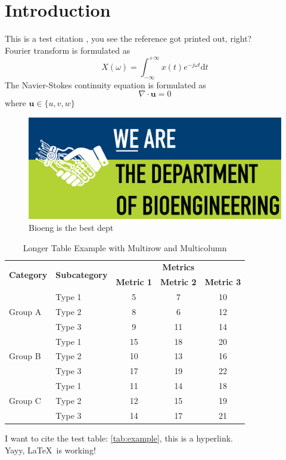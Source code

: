 \newpage

\section{Introduction}

{
This is a test citation \cite{oreo}, you see the reference got printed out, right? \\

Fourier transform is formulated as
\[
    X(\omega) = \int_{-\infty}^{+\infty} x(t)e^{-j\omega t} \mathrm{d}t
\]
The Navier-Stokes continuity equation is formulated as
\[
    \nabla \cdot \mathbf{u} = 0
\]
where $\textbf{u} \in \{u, v, w\}$ \\

\begin{figure}[H]
    \centering
    \includegraphics{figures/Bioeng.png}
    \caption{Bioeng is the best dept}
    \label{fig:my_label}
\end{figure}

\begin{table}[h]
\centering
\begin{tabular}{llccc}
\toprule
\multirow{2}{*}{\textbf{Category}} & \multirow{2}{*}{\textbf{Subcategory}} & \multicolumn{3}{c}{\textbf{Metrics}} \\ \cmidrule(lr){3-5}
&& \textbf{Metric 1} & \textbf{Metric 2} & \textbf{Metric 3} \\ \midrule
    \multirow{3}{*}{Group A}
    & Type 1& 5& 7& 10\\
    & Type 2& 8& 6& 12\\
    & Type 3& 9& 11& 14\\ 
    \midrule
    \multirow{3}{*}{Group B}
    & Type 1& 15& 18& 20\\
    & Type 2& 10& 13& 16\\
    & Type 3& 17& 19& 22\\ 
    \midrule
    \multirow{3}{*}{Group C}
    & Type 1& 11& 14& 18\\
    & Type 2& 12& 15& 19\\
    & Type 3& 14& 17& 21\\ 
    \bottomrule
\end{tabular}
\caption{Longer Table Example with Multirow and Multicolumn}
\label{tab:example}
\end{table}

I want to cite the test table: \autoref{tab:example}, this is a hyperlink. \\

Yayy, \LaTeX \ is working!
}